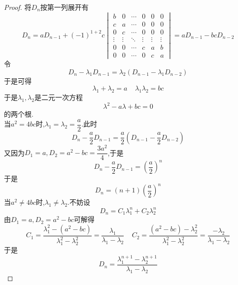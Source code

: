 \documentclass{ctexart}
\begin{document}
\begin{proof}
    将$D_n$按第一列展开有
    \[D_n=aD_{n-1}+(-1)^{1+2}c\begin{vmatrix}
        b&0&\cdots&0&0&0\\
        c&a&\cdots&0&0&0\\
        0&c&\cdots&0&0&0\\
        \vdots&\vdots&\ddots&\vdots&\vdots&\vdots\\
        0&0&\cdots&c&a&b\\
        0&0&\cdots&0&c&a
    \end{vmatrix}=aD_{n-1}-bcD_{n-2}\]
    令
    \[D_n-\lambda_1 D_{n-1}=\lambda_2\left(D_{n-1}-\lambda_1 D_{n-2}\right)\]
    于是可得
    \[\lambda_1+\lambda_2=a\ \ \ \ \ \lambda_1\lambda_2=bc\]
    于是$\lambda_1,\lambda_2$是二元一次方程
    \[\lambda^2-a\lambda+bc=0\]
    的两个根.\\
    \indent 当$a^2=4bc$时,$\lambda_1=\lambda_2=\dfrac{a}{2}$.此时
    \[D_n-\dfrac{a}{2}D_{n-1}=\dfrac{a}{2}\left(D_{n-1}-\dfrac{a}{2}D_{n-2}\right)\]
    又因为$D_1=a,D_2=a^2-bc=\dfrac{3a^2}{4}$,于是
    \[D_{n}-\dfrac{a}{2}D_{n-1}=\left(\dfrac{a}{2}\right)^n\]
    于是
    \[D_n=(n+1)\left(\dfrac{a}{2}\right)^n\]
    \indent 当$a^2\neq4bc$时,$\lambda_1\neq\lambda_2$.不妨设
    \[D_n=C_1\lambda_1^n+C_2\lambda_2^n\]
    由$D_1=a,D_2=a^2-bc$可解得
    \[C_1=\dfrac{\lambda_1^2-(a^2-bc)}{\lambda_1^2-\lambda_2^2}=\dfrac{\lambda_1}{\lambda_1-\lambda_2}\ \ \ \ \ C_2=\dfrac{(a^2-bc)-\lambda_2^2}{\lambda_1^2-\lambda_2^2}=\dfrac{-\lambda_2}{\lambda_1-\lambda_2}\]
    于是
    \[D_n=\dfrac{\lambda_1^{n+1}-\lambda_2^{n+1}}{\lambda_1-\lambda_2}\]
\end{proof}
\end{document}
